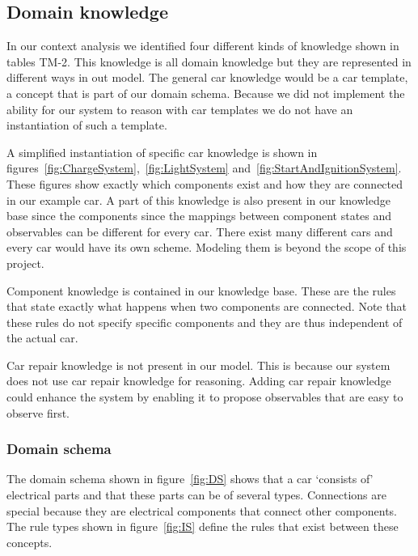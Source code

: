 \documentclass[a4paper,10pt]{article}
\begin{document}
\subsection{Domain knowledge}
In our context analysis we identified four different kinds of knowledge shown in tables TM-2. This knowledge is all domain knowledge but they are represented in different ways in out model. The general car knowledge would be a car template, a concept that is part of our domain schema. Because we did not implement the ability for our system to reason with car templates we do not have an instantiation of such a template.

A simplified instantiation of specific car knowledge is shown in figures~\ref{fig:ChargeSystem},~\ref{fig:LightSystem} and~\ref{fig:StartAndIgnitionSystem}. These figures show exactly which components exist and how they are connected in our example car. A part of this knowledge is also present in our knowledge base since the components since the mappings between component states and observables can be different for every car. There exist many different cars and every car would have its own scheme. Modeling them is beyond the scope of this project.

Component knowledge is contained in our knowledge base. These are the rules that state exactly what happens when two components are connected. Note that these rules do not specify specific components and they are thus independent of the actual car.

Car repair knowledge is not present in our model. This is because our system does not use car repair knowledge for reasoning. Adding car repair knowledge could enhance the system by enabling it to propose observables that are easy to observe first.

\subsubsection{Domain schema}
The domain schema shown in figure~\ref{fig:DS} shows that a car `consists of' electrical parts and that these parts can be of several types. Connections are special because they are electrical components that connect other components. The rule types shown in figure~\ref{fig:IS} define the rules that exist between these concepts. 
\end{document}
